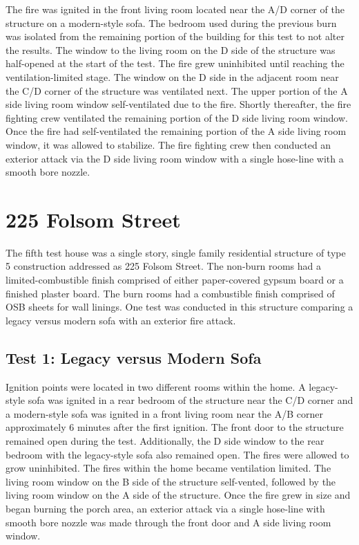 \documentclass[12pt,oneside]{book}
\begin{document}
The fire was ignited in the front living room located near the A/D corner of the structure on a modern-style sofa. The bedroom used during the previous burn was isolated from the remaining portion of the building for this test to not alter the results. The window to the living room on the D side of the structure was half-opened at the start of the test. The fire grew uninhibited until reaching the ventilation-limited stage. The window on the D side in the adjacent room near the C/D corner of the structure was ventilated next. The upper portion of the A side living room window self-ventilated due to the fire. Shortly thereafter, the fire fighting crew ventilated the remaining portion of the D side living room window. Once the fire had self-ventilated the remaining portion of the A side living room window, it was allowed to stabilize. The fire fighting crew then conducted an exterior attack via the D side living room window with a single hose-line with a smooth bore nozzle. 

\section{225 Folsom Street}

 The fifth test house was a single story, single family residential structure of type 5 construction addressed as 225 Folsom Street. The non-burn rooms had a limited-combustible finish comprised of either paper-covered gypsum board or a finished plaster board. The burn rooms had a combustible finish comprised of OSB sheets for wall linings. One test was conducted in this structure comparing a legacy versus modern sofa with an exterior fire attack.
 
\subsection{Test 1: Legacy versus Modern Sofa}

Ignition points were located in two different rooms within the home. A legacy-style sofa was ignited in a rear bedroom of the structure near the C/D corner and a modern-style sofa was ignited in a front living room near the A/B corner approximately 6 minutes after the first ignition. The front door to the structure remained open during the test. Additionally, the D side window to the rear bedroom with the legacy-style sofa also remained open. The fires were allowed to grow uninhibited. The fires within the home became ventilation limited. The living room window on the B side of the structure self-vented, followed by the living room window on the A side of the structure. Once the fire grew in size and began burning the porch area, an exterior attack via a single hose-line with smooth bore nozzle was made through the front door and A side living room window. 
\end{document}
